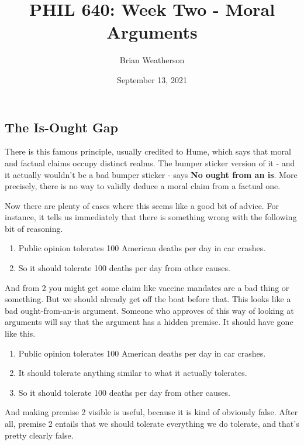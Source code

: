 \documentclass[
]{article}
\title{PHIL 640: Week Two - Moral Arguments}
\author{Brian Weatherson}
\date{September 13, 2021}
\providecommand{\tightlist}{%
  \setlength{\itemsep}{0pt}\setlength{\parskip}{0pt}}
\begin{document}
\maketitle

\hypertarget{the-is-ought-gap}{%
\subsection{The Is-Ought Gap}\label{the-is-ought-gap}}

There is this famous principle, usually credited to Hume, which says
that moral and factual claims occupy distinct realms. The bumper sticker
version of it - and it actually wouldn't be a bad bumper sticker - says
\textbf{No ought from an is}. More precisely, there is no way to validly
deduce a moral claim from a factual one.

Now there are plenty of cases where this seems like a good bit of
advice. For instance, it tells us immediately that there is something
wrong with the following bit of reasoning.

\begin{enumerate}
\def\labelenumi{\arabic{enumi}.}
\tightlist
\item
  Public opinion tolerates 100 American deaths per day in car crashes.
\item
  So it should tolerate 100 deaths per day from other causes.
\end{enumerate}

And from 2 you might get some claim like vaccine mandates are a bad
thing or something. But we should already get off the boat before that.
This looks like a bad ought-from-an-is argument. Someone who approves of
this way of looking at arguments will say that the argument has a hidden
premise. It should have gone like this.

\begin{enumerate}
\def\labelenumi{\arabic{enumi}.}
\tightlist
\item
  Public opinion tolerates 100 American deaths per day in car crashes.
\item
  It should tolerate anything similar to what it actually tolerates.
\item
  So it should tolerate 100 deaths per day from other causes.
\end{enumerate}

And making premise 2 visible is useful, because it is kind of obviously
false. After all, premise 2 entails that we should tolerate everything
we do tolerate, and that's pretty clearly false.
\end{document}

